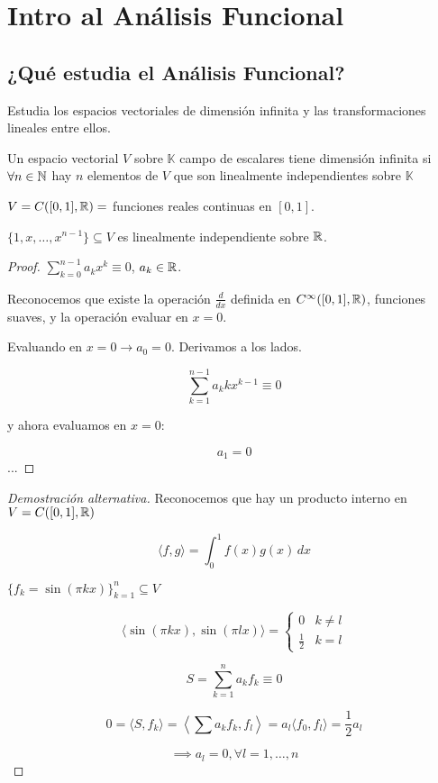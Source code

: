 \chapter{Intro al Análisis Funcional}

\section{¿Qué estudia el Análisis Funcional?}

Estudia los espacios vectoriales de dimensión infinita y las transformaciones lineales entre ellos.

\begin{fdefinition}
    Un espacio vectorial $V$ sobre $\mathbb{K}$ campo de escalares tiene dimensión infinita si $\forall n\in\mathbb{N}$ hay $n$ elementos de $V$ que son linealmente independientes sobre $\mathbb{K}$
\end{fdefinition}

\begin{fexample}
    $V=C([0,1],\mathbb{R})=$ funciones reales continuas en $[0,1]$.

    $\{1,x,\ldots,x^{n-1}\}\subseteq V$ es linealmente independiente sobre $\mathbb{R}$.
\end{fexample}

\begin{proof}
    $\displaystyle\sum_{k=0}^{n-1}a_kx^k\equiv 0$, $a_k\in\mathbb{R}$.

    Reconocemos que existe la operación $\frac{d}{dx}$ definida en $C^{\infty}([0,1],\mathbb{R})$, funciones suaves, y la operación evaluar en $x=0$.

    Evaluando en $x=0\to a_0=0$. Derivamos a los lados.

    \[\sum_{k=1}^{n-1}a_k k x^{k-1}\equiv 0\]

    y ahora evaluamos en $x=0$:
    
    $$a_1=0$$...
\end{proof}

\begin{proof}[Demostración alternativa]
    Reconocemos que hay un producto interno en $V=C([0,1],\mathbb{R})$

    \[\langle f,g\rangle=\int_0^1 f(x)g(x)\,dx\]

    $\{f_k=\sin (\pi kx)\}_{k=1}^n\subseteq V$

    \[\langle \sin (\pi kx),\sin (\pi lx)\rangle=\begin{cases} 0&k\neq l\\
    \frac{1}{2}&k=l\end{cases}\]

    \[S=\sum_{k=1}^n a_kf_k\equiv 0\]

    \[0=\langle S,f_k\rangle=\left\langle \sum a_kf_k,f_l\right\rangle=a_l\langle f_0,f_l\rangle =\frac{1}{2}a_l\]

    \[\implies a_l=0, \forall l=1,\ldots,n\]

\end{proof}

